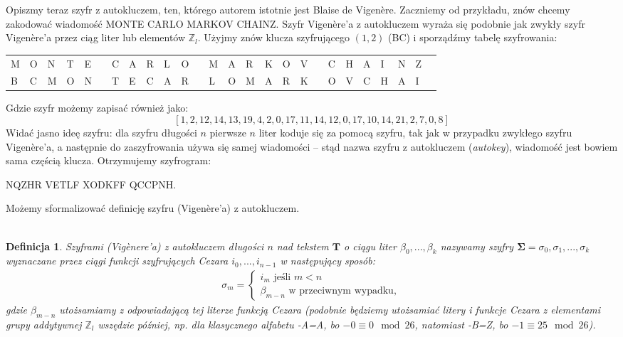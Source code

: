 \documentclass[a4paper]{article}
\theoremstyle{defn}
\newtheorem{defn}{Definicja}[subsection]
\theoremstyle{theorem}
\theoremstyle{lemma}
\theoremstyle{cor}
\theoremstyle{fact}
\begin{document}
Opiszmy teraz szyfr z autokluczem, ten, którego autorem istotnie jest Blaise de Vigenère. Zaczniemy od przykładu, znów chcemy zakodować wiadomość MONTE CARLO MARKOV CHAINZ. Szyfr Vigenère'a z autokluczem wyraża się podobnie jak zwykły szyfr Vigenère'a przez ciąg liter lub elementów $\mathbb{Z}_l$. Użyjmy znów klucza szyfrującego $(1, 2)$ (BC) i sporządźmy tabelę szyfrowania:
\begin{center}\begin{tabular}{|p{1.5mm}|p{1.5mm}|p{1.5mm}|p{1.5mm}|p{1.5mm}|p{1.5mm}|p{1.5mm}|p{1.5mm}|p{1.5mm}|p{1.5mm}|p{1.5mm}|p{1.5mm}|p{1.5mm}|p{1.5mm}|p{1.5mm}|p{1.5mm}|p{1.5mm}|p{1.5mm}|p{1.5mm}|p{1.5mm}|p{1.5mm}|p{1.5mm}|p{1.5mm}|p{1.5mm}|p{1.5mm}|p{1.5mm}|}
    M & O & N & T & E & & C & A & R & L & O & & M & A & R & K & O & V & & C & H & A & I & N & Z \\
    B & C & M & O & N & & T & E & C & A & R & & L & O & M & A & R & K & & O & V & C & H & A & I
\end{tabular}
\end{center}
Gdzie szyfr możemy zapisać również jako:
$$[1, 2, 12, 14, 13, 19, 4, 2, 0, 17, 11, 14, 12, 0, 17, 10, 14, 21, 2, 7, 0, 8]$$
Widać jasno ideę szyfru: dla szyfru długości $n$ pierwsze $n$ liter koduje się za pomocą szyfru, tak jak w przypadku zwykłego szyfru Vigenère'a, a następnie do zaszyfrowania używa się samej wiadomości – stąd nazwa szyfru z autokluczem (\textit{autokey}), wiadomość jest bowiem sama częścią klucza. Otrzymujemy szyfrogram:\\
\begin{center}
    NQZHR VETLF XODKFF QCCPNH.
\end{center}
Możemy sformalizować definicję szyfru (Vigenère'a) z autokluczem. \\\\
\begin{defn}\label{defn4.2.2}
\textit{Szyframi (Vigènere'a) z autokluczem} długości $n$ nad tekstem $\boldsymbol{T}$ o ciągu liter $\beta_0, ..., \beta_k$ nazywamy szyfry $\boldsymbol{\Sigma} = \sigma_0, \sigma_1, ..., \sigma_k$ wyznaczane przez ciągi funkcji szyfrujących Cezara $i_0, ..., i_{n-1}$ w następujący sposób:
\begin{align*}
\sigma_m =
\begin{cases}
  i_m \text{ jeśli } m < n  \\
  \beta_{m-n} \text{ w przeciwnym wypadku},
\end{cases}
\end{align*}
gdzie $\beta_{m-n}$ utożsamiamy z odpowiadającą tej literze funkcją Cezara (podobnie będziemy utożsamiać litery i funkcje Cezara z elementami grupy addytywnej $\mathbb{Z}_l$ wszędzie później, np. dla klasycznego alfabetu -A=A, bo $-0 \equiv 0 \mod 26$, natomiast -B=Z, bo $-1 \equiv 25 \mod 26$).
\end{defn}\
\end{document}
